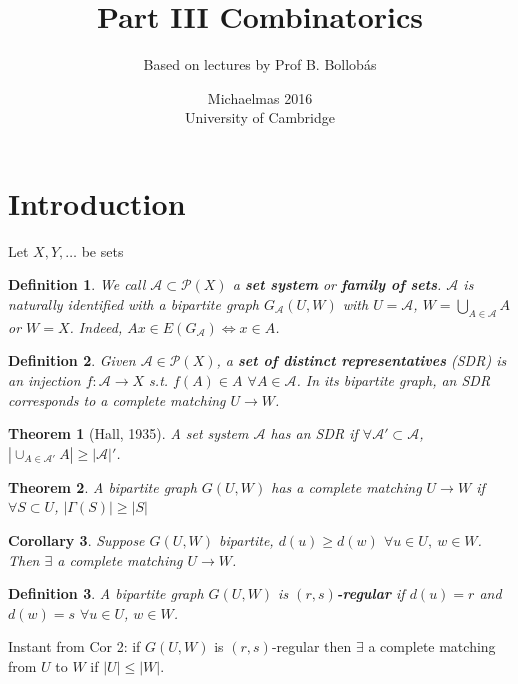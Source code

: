 \documentclass[a4paper]{article}
\title{Part III Combinatorics}
\author{Based on lectures by Prof B. Bollob\'{a}s}
\date{Michaelmas 2016\\University of Cambridge}
\newtheorem*{definition}{Definition}
\newtheorem{theorem}{Theorem}
\newtheorem{corollary}[theorem]{Corollary}
\newcommand*\abs[1]{\left|#1\right|}
\begin{document}
\maketitle
\tableofcontents

\section{Introduction}
Let $X, Y, \dots$ be sets
\begin{definition}
	We call $\mathcal{A}\subset \mathcal{P}(X)$ a \textbf{set system} or \textbf{family of sets}.
	$\mathcal{A}$ is naturally identified with a bipartite graph $G_\mathcal{A}(U,W)$ with $U=\mathcal{A}$, $W=\bigcup_{A\in\mathcal{A}}A$ or $W=X$.
	Indeed, $Ax\in E(G_\mathcal{A}) \iff x \in A$.
\end{definition}

\begin{definition}
	Given $\mathcal{A}\in\mathcal{P}(X)$, a \textbf{set of distinct representatives} (SDR) is an injection $f:\mathcal{A}\to X$ s.t. $f(A)\in A$ $\forall A \in \mathcal{A}$.
	In its bipartite graph, an SDR corresponds to a complete matching $U \to W$.
\end{definition}

\begin{theorem}[Hall, 1935]
	A set system $\mathcal{A}$ has an SDR if $\forall \mathcal{A}'\subset\mathcal{A}$, $\abs{\cup_{A\in\mathcal{A}'}A} \geq \abs{\mathcal{A}}'$.
\end{theorem}
\setcounter{theorem}{0}
\renewcommand{\thetheorem}{\arabic{theorem}'}
\begin{theorem}
	A bipartite graph $G(U,W)$ has a complete matching $U \to W$ if $\forall S \subset U$, $\abs{\Gamma(S)} \geq \abs{S}$
\end{theorem}
\renewcommand{\thetheorem}{\arabic{theorem}}
\begin{corollary}
	Suppose $G(U, W)$ bipartite, $d(u) \geq d(w)$ $\forall u \in U,\ w \in W$. Then $\exists$ a complete matching $U \to W$.
\end{corollary}

\begin{definition}
	A bipartite graph $G(U,W)$ is $(r,s)$\textbf{-regular} if $d(u)=r$ and $d(w)=s$ $\forall u\in U$, $w \in W$.
\end{definition}

Instant from Cor 2: if $G(U,W)$ is $(r,s)$-regular then $\exists$ a complete matching from $U$ to $W$ if $\abs{U} \leq \abs{W}$.
\end{document}

